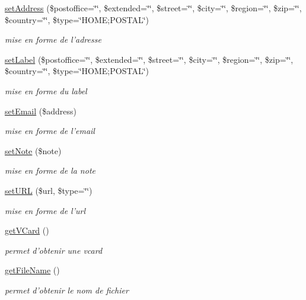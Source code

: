 \begin{CompactItemize}
\hyperlink{classvCard_a5}{set\-Address} (\$postoffice=\char`\"{}\char`\"{}, \$extended=\char`\"{}\char`\"{}, \$street=\char`\"{}\char`\"{}, \$city=\char`\"{}\char`\"{}, \$region=\char`\"{}\char`\"{}, \$zip=\char`\"{}\char`\"{}, \$country=\char`\"{}\char`\"{}, \$type=\char`\"{}HOME;POSTAL\char`\"{})
\begin{CompactList}\small\item\em mise en forme de l'adresse \item\end{CompactList}\item 
\hyperlink{classvCard_a6}{set\-Label} (\$postoffice=\char`\"{}\char`\"{}, \$extended=\char`\"{}\char`\"{}, \$street=\char`\"{}\char`\"{}, \$city=\char`\"{}\char`\"{}, \$region=\char`\"{}\char`\"{}, \$zip=\char`\"{}\char`\"{}, \$country=\char`\"{}\char`\"{}, \$type=\char`\"{}HOME;POSTAL\char`\"{})
\begin{CompactList}\small\item\em mise en forme du label \item\end{CompactList}\item 
\hyperlink{classvCard_a7}{set\-Email} (\$address)
\begin{CompactList}\small\item\em mise en forme de l'email \item\end{CompactList}\item 
\hyperlink{classvCard_a8}{set\-Note} (\$note)
\begin{CompactList}\small\item\em mise en forme de la note \item\end{CompactList}\item 
\hyperlink{classvCard_a9}{set\-URL} (\$url, \$type=\char`\"{}\char`\"{})
\begin{CompactList}\small\item\em mise en forme de l'url \item\end{CompactList}\item 
\hypertarget{classvCard_a10}{
\hyperlink{classvCard_a10}{get\-VCard} ()}
\label{classvCard_a10}

\begin{CompactList}\small\item\em permet d'obtenir une vcard \item\end{CompactList}\item 
\hypertarget{classvCard_a11}{
\hyperlink{classvCard_a11}{get\-File\-Name} ()}
\label{classvCard_a11}

\begin{CompactList}\small\item\em permet d'obtenir le nom de fichier \item\end{CompactList}\end{CompactItemize}



